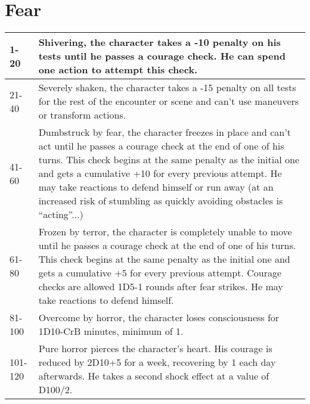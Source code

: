 \documentclass[12pt,a4paper,openany]{book}
\begin{document}
	\section{Fear}
	\label{feartable}
	\begin{tabularx}{\textwidth}{|l|X|}
		\hline
		1-20    & Shivering, the character takes a -10 penalty on his tests until he passes a courage check. He can spend one action to attempt this check.                                                                                                                                                                                                                                            \\ \hline
		21-40   & Severely shaken, the character takes a -15 penalty on all tests for the rest of the encounter or scene and can't use maneuvers or transform actions.                                                                                                                                                                                                                                 \\ \hline
		41-60   & Dumbstruck by fear, the character freezes in place and can’t act until he passes a courage check at the end of one of his turns. This check begins at the same penalty as the initial one and gets a cumulative +10 for every previous attempt. He may take reactions to defend himself or run away (at an increased risk of stumbling as quickly avoiding obstacles is “acting”...) \\ \hline
		61-80   & Frozen by terror, the character is completely unable to move until he passes a courage check at the end of one of his turns. This check begins at the same penalty as the initial one and gets a cumulative +5 for every previous attempt. Courage checks are allowed 1D5-1 rounds after fear strikes. He may take reactions to defend himself.                                      \\ \hline
		81-100  & Overcome by horror, the character loses consciousness for 1D10-CrB minutes, minimum of 1.                                                                                                                                                                                                                                                                                            \\ \hline
		101-120 & Pure horror pierces the character’s heart. His courage is reduced by 2D10+5 for a week, recovering by 1 each day afterwards. He takes a second shock effect at a value of D100/2.                                                                                                                                                                                                    \\ \hline

\end{tabularx}
\end{document}
